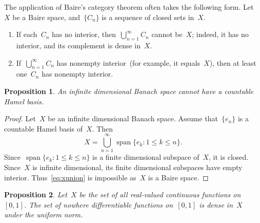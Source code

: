 \documentclass[11pt,a4paper]{article}  %
\newtheorem{proposition}{Proposition}[section]
\theoremstyle{definition}
\DeclareMathOperator{\Span}{span}
\numberwithin{equation}{section}
\begin{document}
The application of Baire's category theorem often takes the following form. Let~$X$ be a Baire
space, and~$\{C_n\}$ is a sequence of closed sets in~$X$.
\begin{enumerate}
    \item If each~$C_n$ has no interior, then~$\bigcup_{n=1}^\infty C_n$ cannot be~$X$; indeed, it
        has no interior, and its complement is dense in~$X$.
    \item If~$\bigcup_{n=1}^\infty C_n$ has nonempty interior~(for example, it equals~$X$), then at least
        one~$C_n$ has nonempty interior.
\end{enumerate}

\begin{proposition}
    \label{prop:banach}
    An infinite dimensional Banach space cannot have a countable Hamel basis.
\end{proposition}

\begin{proof}
    Let~$X$ be an infinite dimensional Banach space. Assume that~$\{e_n\}$ is a countable Hamel basis of~$X$.
    Then
    \begin{equation}
        \label{eq:xunion}
        X = \bigcup_{n=1}^\infty \Span\{e_k \mathrel{:} 1\le k \le n\}.
    \end{equation}
    Since~$\Span\{e_k \mathrel{:} 1\le k \le n\}$ is a finite dimensional subspace of~$X$, it is
    closed. Since~$X$ is infinite dimensional, its finite dimensional subspaces have empty interior.
    Thus~\eqref{eq:xunion} is impossible as~$X$ is a Baire space.
\end{proof}

\begin{proposition}
    \label{prop:nodiff}
    Let~$X$ be the set of all real-valued continuous functions on $[0,1]$.
    The set of nowhere differentiable functions on~$[0,1]$ is dense in~$X$ under the uniform norm.
\end{proposition}
\end{document}
